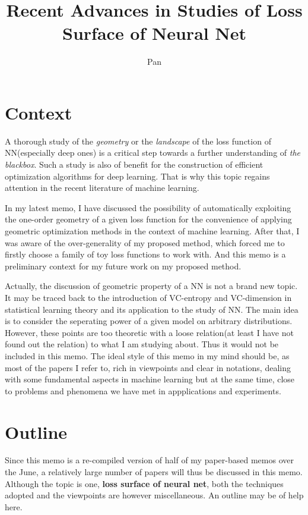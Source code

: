 \documentclass[10pt,a4paper]{article}
\author{Pan}
\title{Recent Advances in Studies of Loss Surface of Neural Net}
\begin{document}
\maketitle
\section{Context}
A thorough study of the \textit{geometry} or the \textit{landscape} of the loss function of NN(especially deep ones) is a critical step towards a further understanding of \textit{the blackbox}.\cite{open2015} Such a study is also of benefit for the construction of efficient optimization algorithms for deep learning. That is why this topic regains attention in the recent literature of machine learning.

In my latest memo\cite{memo}, I have discussed the possibility of automatically exploiting the one-order geometry of a given loss function for the convenience of applying geometric optimization methods in the context of machine learning. After that, I was aware of the over-generality of my proposed method, which forced me to firstly choose a family of toy loss functions to work with. And this memo is a preliminary context for my future work on my proposed method.   

Actually, the discussion of geometric property of a NN is not a brand new topic. It may be traced back to the introduction of VC-entropy and VC-dimension in statistical learning theory\cite{vapnik2012the} and its application to the study of NN\cite{Anthony2009}. The main idea is to consider the seperating power of a given model on arbitrary distributions. However, these points are too theoretic with a loose relation(at least I have not found out the relation) to what I am studying about. Thus it would not be included in this memo. The ideal style of this memo in my mind should be, as most of the papers I refer to, rich in viewpoints and clear in notations, dealing with some fundamental aspects in machine learning but at the same time, close to problems and phenomena we have met in appplications and experiments.

\section{Outline}
Since this memo is a re-compiled version of half of my paper-based memos over the June, a relatively large number of papers will thus be discussed in this memo. Although the topic is one, \textbf{loss surface of neural net}, both the techniques adopted and the viewpoints are however miscellaneous. An outline may be of help here.
\end{document}
